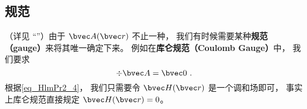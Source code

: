 \subsection{规范}
（详见 “”）由于 $\bvec A(\bvec r)$ 不止一种， 我们有时候需要某种\textbf{规范（gauge）}来将其唯一确定下来。 例如在\textbf{库仑规范（Coulomb Gauge）}中， 我们要求
\begin{equation}
\div \bvec A = \bvec 0~.
\end{equation}
根据\autoref{eq_HlmPr2_4}， 我们只需要令 $\bvec H(\bvec r)$ 是一个调和场即可， 事实上库仑规范直接规定 $\bvec H(\bvec r) = 0$。
